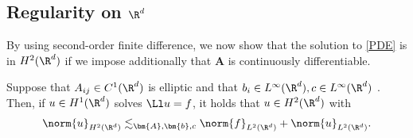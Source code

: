 \documentclass[
    a4paper,
    DIV=14,
    abstract=true,
    numbers=noenddot
]{scrartcl}
\begin{document}
\subsection{Regularity on $\R^d$ }
By using second-order finite difference, we now show that the solution to \eqref{PDE} is in $H^2(\R^d)$ if we impose additionally that $\bm{A}$ is continuously differentiable.
\begin{theorem}\label{improved reg Rd}
    Suppose that $A_{ij}\in C^1(\R^d)$ is elliptic and that $b_i \in L^\infty(\R^d ), c \in L^\infty(\R^d)$ . Then, if $u \in H^1(\R^d)$ solves $\Ll u=f$, it holds that $u \in H^2(\R^d)$ with
    \begin{align*}
        \norm{u}_{H^2(\R^d)} \lesssim_{\bm{A},\bm{b},c} \norm{f}_{L^2(\R^d)}+\norm{u}_{L^2(\R^d)}.
    \end{align*}
\end{theorem}
\end{document}

